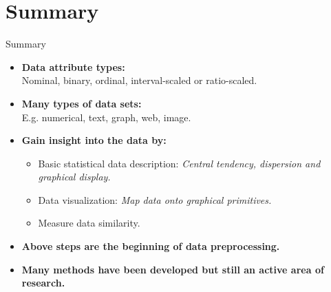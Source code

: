 \section{Summary}

\begin{frame}{Summary}
	\centering
	\begin{itemize}
		\item \textbf{Data attribute types:}\\
		      Nominal, binary, ordinal, interval-scaled or ratio-scaled.
		\item \textbf{Many types of data sets:}\\
		      E.g. numerical, text, graph, web, image.
		\item \textbf{Gain insight into the data by:}
		      \begin{itemize}
			      \item Basic statistical data description: \emph{Central tendency, dispersion and graphical display.}
			      \item Data visualization: \emph{Map data onto graphical primitives.}
			      \item Measure data similarity.
		      \end{itemize}
		\item \textbf{Above steps are the beginning of data preprocessing.}
		\item \textbf{Many methods have been developed but still an active area of research.}
	\end{itemize}
\end{frame}
